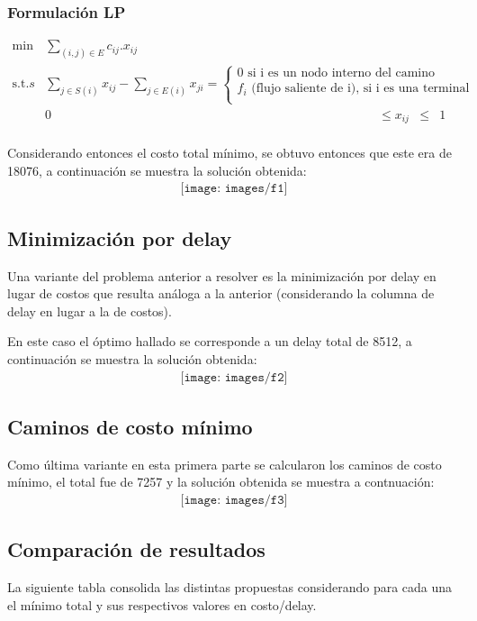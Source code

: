 \documentclass[a4paper,11pt]{article}
\theoremstyle{break}
\begin{document}
\subsubsection{Formulación LP}
\begin{equation}
\begin{array}{rrclcl}
\displaystyle \min & \sum_{(i,j) \in E} c_{ij}.x_{ij}  \\
\textrm{s.t.} s& \sum_{j \in S(i)} x_{ij} - \sum_{j \in E(i)} x_{ji} =\begin{cases}
				0 \text{ si i es un nodo interno del camino}\\
				f_{i} \text{ (flujo saliente de i), si i es una terminal}\\
				\end{cases} 
\\
& 0 & \leq x_{ij} & \leq & 1  & \\
\end{array}
\end{equation}

Considerando entonces el costo total mínimo, se obtuvo entonces que este era de 18076, a continuación se muestra la solución obtenida:
\begin{align*}
\texttt{[image: images/f1]}
\end{align*}
\newpage
\subsection{Minimización por delay}
Una variante del problema anterior a resolver es la minimización por delay en lugar de costos que resulta análoga a la anterior (considerando la columna de delay en lugar a la de costos).

En este caso el óptimo hallado se corresponde a un delay total de 8512, a continuación se muestra la solución obtenida:
\begin{align*}
\texttt{[image: images/f2]}
\end{align*}

\subsection{Caminos de costo mínimo}
Como última variante en esta primera parte se calcularon los caminos de costo mínimo, el total fue de 7257 y la solución obtenida se muestra a contnuación:
\begin{align*}
\texttt{[image: images/f3]}
\end{align*}
\subsection{Comparación de resultados}
La siguiente tabla consolida las distintas propuestas considerando para cada una el mínimo total y sus respectivos valores en costo/delay.
\end{document}
